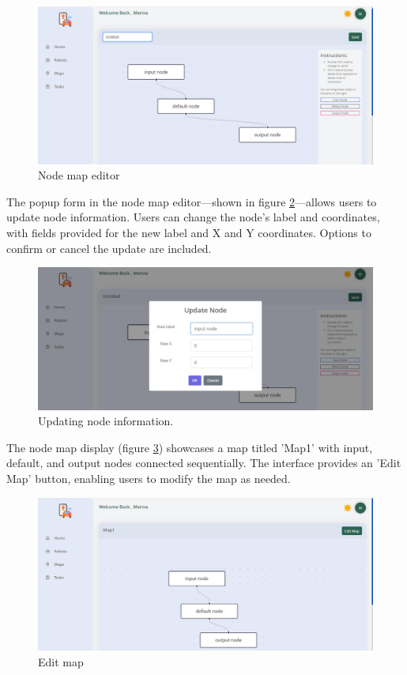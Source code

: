     \begin{figure}[h!]
        \centering
        \includegraphics[scale=0.4]{Figures/WebApp/newMap.png}
        \caption{Node map editor}
        \label{fig:node-map-editor}
    \end{figure}

\newpage

    The popup form in the node map editor---shown in figure \ref{fig:edit-node}---allows users to update node information. Users can change the node's label and coordinates, with fields provided for the new label and X and Y coordinates. Options to confirm or cancel the update are included.

    \begin{figure}[h!]
        \centering
        \includegraphics[scale=0.4]{Figures/WebApp/editNode.png}
        \caption{Updating node information.}
        \label{fig:edit-node}
    \end{figure}

    The node map display (figure \ref{fig:edit-map}) showcases a map titled 'Map1' with input, default, and output nodes connected sequentially. The interface provides an 'Edit Map' button, enabling users to modify the map as needed.


    \begin{figure}[h!]
        \centering
        \includegraphics[scale=0.4]{Figures/WebApp/editMap.png}
        \caption{Edit map}
        \label{fig:edit-map}
    \end{figure}


